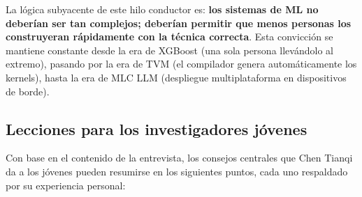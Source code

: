 La lógica subyacente de este hilo conductor es: \textbf{los sistemas de ML no deberían ser tan complejos; deberían permitir que menos personas los construyeran rápidamente con la técnica correcta}. Esta convicción se mantiene constante desde la era de XGBoost (una sola persona llevándolo al extremo), pasando por la era de TVM (el compilador genera automáticamente los kernels), hasta la era de MLC LLM (despliegue multiplataforma en dispositivos de borde).

\subsection{Lecciones para los investigadores jóvenes}

Con base en el contenido de la entrevista, los consejos centrales que Chen Tianqi da a los jóvenes pueden resumirse en los siguientes puntos, cada uno respaldado por su experiencia personal:

